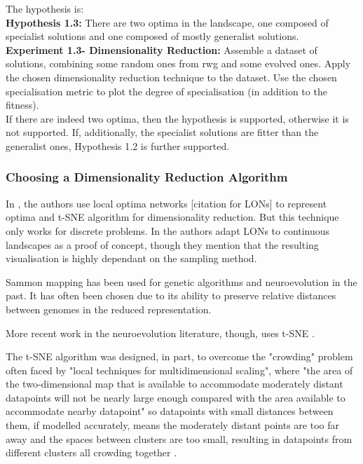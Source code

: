 \documentclass[12pt]{article}
\begin{document}
The hypothesis is:\\

\textbf{Hypothesis 1.3:} There are two optima in the landscape, one composed of specialist solutions and one composed of mostly generalist solutions. \\

\textbf{Experiment 1.3- Dimensionality Reduction:} Assemble a dataset of solutions, combining some random ones from rwg and some evolved ones.
Apply the chosen dimensionality reduction technique to the dataset.
Use the chosen specialisation metric to plot the degree of specialisation (in addition to the fitness).\\

If there are indeed two optima, then the hypothesis is supported, otherwise it is not supported.
If, additionally, the specialist solutions are fitter than the generalist ones, Hypothesis 1.2 is further supported.\\

\subsubsection{Choosing a Dimensionality Reduction Algorithm}

In \cite{veerapen:GPEM:2018}, the authors use local optima networks [citation for LONs] to represent optima and t-SNE algorithm \cite{vanDerMaaten:JMLR:2008} for dimensionality reduction.
But this technique only works for discrete problems.
In \cite{adair:GECCO:2019} the authors adapt LONs to continuous landscapes as a proof of concept, though they mention that the resulting  visualisation is highly dependant on the sampling method.

Sammon mapping \cite{sammon:IEEETR:1969} has been used for genetic algorithms  \cite{kim:GECCO:2003} and neuroevolution \cite{risi:AB:2010, silva:EC:2015} in the past.
It has often been chosen due to its ability to preserve relative distances between genomes in the reduced representation.

More recent work in the neuroevolution literature, though, \cite{wang:GECCO:2018, risi:GECCO:2019} uses t-SNE \cite{vanDerMaaten:JMLR:2008}.

The t-SNE algorithm was designed, in part, to overcome the "crowding" problem often faced by "local techniques for multidimensional scaling", where "the area of the two-dimensional map that is available to accommodate moderately distant datapoints will not be nearly large enough compared with the area available to accommodate nearby datapoint" so datapoints with small distances between them, if modelled accurately, means the moderately distant points are too far away and the spaces between clusters are too small, resulting in datapoints from different clusters all crowding together \cite{vanDerMaaten:JMLR:2008}.
\end{document}
